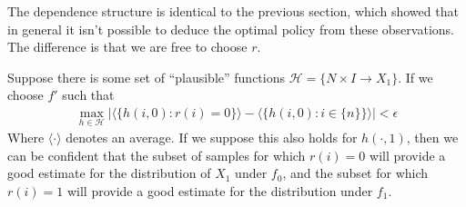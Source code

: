 \begin{center}
\end{center}

The dependence structure is identical to the previous section, which showed that in general it isn't possible to deduce the optimal policy from these observations. The difference is that we are free to choose $r$.

Suppose there is some set of ``plausible'' functions $\mathcal{H}=\{N\times I\to X_1\}$. If we choose $f'$ such that 
\begin{align}
    \max_{h\in\mathcal{H}} \left| \langle \{h(i,0):r(i)=0\}\rangle - \langle \{h(i,0):i\in\{n\}\} \rangle \right| < \epsilon \label{eq:bin_random}
\end{align}
Where $\langle\cdot\rangle$ denotes an average. If we suppose this also holds for $h(\cdot,1)$, then we can be confident that the subset of samples for which $r(i)=0$ will provide a good estimate for the distribution of $X_1$ under $f_0$, and the subset for which $r(i)=1$ will provide a good estimate for the distribution under $f_1$.







